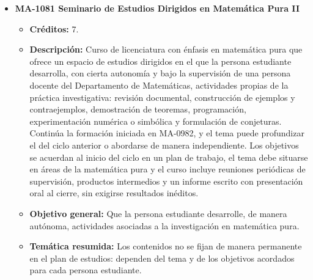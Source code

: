 \begin{itemize}[leftmargin=1.3em, itemsep=10pt, topsep=4pt, label={\color{Azul-UCR}$\blacksquare$}]
\item {\color{Azul-UCR}\textbf{MA-1081 Seminario de Estudios Dirigidos en Matemática Pura II}}\par\nopagebreak\smallskip
\begin{itemize}[leftmargin=1.1em, itemsep=3pt, topsep=2pt, parsep=2pt, label={\textendash}]
\item \textbf{Créditos:} 7.
\item \textbf{Descripción:} Curso de licenciatura con énfasis en matemática pura que ofrece un espacio de estudios dirigidos en el que la persona estudiante desarrolla, con cierta autonomía y bajo la supervisión de una persona docente del Departamento de Matemáticas, actividades propias de la práctica investigativa: revisión documental, construcción de ejemplos y contraejemplos, demostración de teoremas, programación, experimentación numérica o simbólica y formulación de conjeturas. Continúa la formación iniciada en MA-0982, y el tema puede profundizar el del ciclo anterior o abordarse de manera independiente. Los objetivos se acuerdan al inicio del ciclo en un plan de trabajo, el tema debe situarse en áreas de la matemática pura y el curso incluye reuniones periódicas de supervisión, productos intermedios y un informe escrito con presentación oral al cierre, sin exigirse resultados inéditos.
\item \textbf{Objetivo general:} Que la persona estudiante desarrolle, de manera autónoma, actividades asociadas a la investigación en matemática pura.
\item \textbf{Temática resumida:} Los contenidos no se fijan de manera permanente en el plan de estudios: dependen del tema y de los objetivos acordados para cada persona estudiante.
\end{itemize}


\end{itemize}
